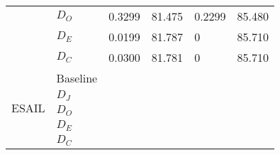 \begin{table}[]
\begin{tabular}{|llllll|}
           & $D_O$                      &   0.3299   & 81.475&     0.2299  &85.480 \\
           & $D_E$                      &   0.0199   & 81.787&     0   &85.710\\
           & $D_C$                      &    0.0300  & 81.781&     0  &85.710 \\
\hline
\multirow{5}{*}{ESAIL}      & Baseline &       &        \\
           & $D_J$     &       &        \\
           & $D_O$     &       &        \\
           & $D_E$     &       &        \\
           & $D_C$     &       &       \\
\hline
\end{tabular}
\end{table}


